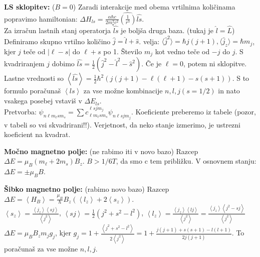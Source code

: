 \documentclass[a4paper, oneside, 12pt]{article}
\theoremstyle{definition}
\begin{document}
\textbf{LS sklopitev:} ($B = 0$)
Zaradi interakcije med obema vrtilnima količinama popravimo hamiltonian:
$\Delta H_{ls} = \frac{\alpha \hbar c}{2m_{\mathsf{e}}^2c^2} \hat{(\frac{1}{r^3})} \hat{ls}$.\\
Za izračun lastnih stanj operatorja $\hat{ls}$ je boljša druga baza. (tukaj je $\hat{l} = \hat{L}$)
Definiramo skupno vrtilno količino $\hat{j} = \hat{l} + \hat{s}$.
velja: $\langle \hat{j}^2\rangle = \hbar j(j+1), \langle  \hat{j}_z \rangle = \hbar m_j$, kjer $j$ teče od
$|\ell-s|$ do $\ell+s$ po 1. Število $m_j$ kot vedno teče od $-j$ do $j$.
S kvadriranjem $j$ dobimo $\hat{ls} = \frac12(\hat{j}^2 - \hat{l}^2 - \hat{s}^2)$.
Če je $\ell = 0$, potem ni sklopitve. Lastne vrednosti so $\left\langle \hat{ls}\right\rangle = \frac{1}{2} \hbar^2 (j(j+1) - \ell(\ell+1) - s(s+1))$. S to formulo poračunaš $\left\langle ls\right\rangle$ za vse možne kombinacije $n, l, j (s = 1/2)$ in nato vsakega posebej vstaviš v $\Delta E_{ls}$.\\
Pretvorba: $\psi_{n\ell m_\ell sm_s} = \sum c_{\ell m_\ell s m_s}^{\ell sjm_j} \psi_{n\ell sjm_j}$.
Koeficiente preberemo iz tabele (pozor, v tabeli so vsi skvadrirani!!). Verjetnost, da neko stanje izmerimo, je ustrezni koeficient na kvadrat.

\textbf{Močno magnetno polje:} (ne rabimo iti v novo bazo) Razcep $\Delta E = \mu_B(m_\ell + 2m_s)B_z$. $B > 1/6 T$, da smo c tem približku. V osnovnem stanju: $\Delta E = \pm \mu_B B$.

\textbf{Šibko magnetno polje:} (rabimo novo bazo) Razcep $\Delta E = \left\langle H_B\right\rangle = \frac{\mu_B}{\hbar} B_z (\left\langle l_z\right\rangle + 2\left\langle s_z\right\rangle)$.\\
$\left\langle s_z\right\rangle = \frac{\left\langle j_z\right\rangle \left\langle sj\right\rangle}{\left\langle j^2\right\rangle}$, $\left\langle sj\right\rangle = \frac{1}{2} (j^2 + s^2 - l^2)$, $\left\langle l_z\right\rangle = \frac{\left\langle j_z\right\rangle \left\langle lj\right\rangle}{\left\langle j^2\right\rangle} = \frac{\left\langle j_z\right\rangle \left\langle j^2 - sj\right\rangle}{\left\langle j^2\right\rangle}$\\
$\Delta E = \mu_B B_z m_j g_j$, kjer $g_j = 1 + \frac{\left\langle j^2 + s^2 - l^2\right\rangle}{2 \left\langle j^2\right\rangle} = 1 + \frac{j(j+1) + s(s+1) - l(l+1)}{2 j(j+1)}$. To poračunaš za vse možne $n,l,j$.
\end{document}
